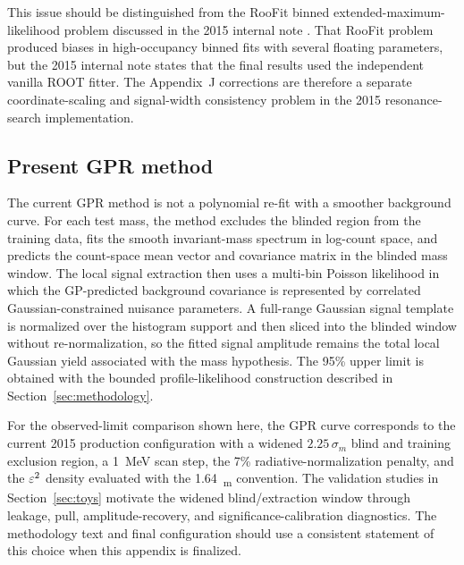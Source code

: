 This issue should be distinguished from the RooFit binned extended-maximum-likelihood
problem discussed in the 2015 internal note \cite{HPS2015InternalNote}.  That RooFit
problem produced biases in high-occupancy binned fits with several floating
parameters, but the 2015 internal note states that the final results used the
independent vanilla ROOT fitter.  The Appendix~J corrections are therefore a separate
coordinate-scaling and signal-width consistency problem in the 2015 resonance-search
implementation.

\subsection{Present GPR method}

The current GPR method is not a polynomial re-fit with a smoother background curve.
For each test mass, the method excludes the blinded region from the training data,
fits the smooth invariant-mass spectrum in log-count space, and predicts the
count-space mean vector and covariance matrix in the blinded mass window.  The local
signal extraction then uses a multi-bin Poisson likelihood in which the GP-predicted
background covariance is represented by correlated Gaussian-constrained nuisance
parameters.  A full-range Gaussian signal template is normalized over the histogram
support and then sliced into the blinded window without re-normalization, so the fitted
signal amplitude remains the total local Gaussian yield associated with the mass
hypothesis.  The 95\% upper limit is obtained with the bounded profile-likelihood
\CLs{} construction described in Section~\ref{sec:methodology}.

For the observed-limit comparison shown here, the GPR curve corresponds to the current
2015 production configuration with a widened $2.25\,\sigma_m$ blind and training
exclusion region, a \SI{1}{MeV} scan step, the 7\% radiative-normalization penalty, and
the $\varepsilon^2$ density evaluated with the \SI{1.64}{\sigma_m} convention.  The
validation studies in Section~\ref{sec:toys} motivate the widened blind/extraction
window through leakage, pull, amplitude-recovery, and significance-calibration
diagnostics.  The methodology text and final configuration should use a consistent
statement of this choice when this appendix is finalized.

